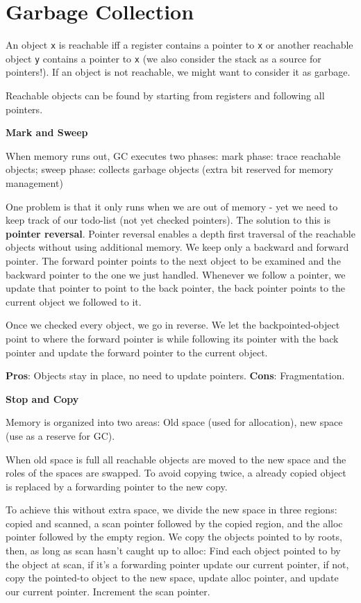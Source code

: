 \section*{Garbage Collection}

An object \texttt{x} is reachable iff a register contains a pointer to \texttt{x} or another reachable object \texttt{y} contains a pointer to \texttt{x} (we also consider the stack as a source for pointers!). If an object is not reachable, we might want to consider it as garbage. \medskip
	
Reachable objects can be found by starting from registers and following all pointers. \medskip

\textbf{Mark and Sweep} \smallskip
	
When memory runs out, GC executes two phases: mark phase: trace reachable objects; sweep phase: collects garbage objects (extra bit reserved for memory management)\medskip
	
One problem is that it only runs when we are out of memory - yet we need to keep track of our todo-list (not yet checked pointers). The solution to this is \textbf{pointer reversal}. Pointer reversal enables a depth first traversal of the reachable objects without using additional memory. We keep only a backward and forward pointer. The forward pointer points to the next object to be examined and the backward pointer to the one we just handled. Whenever we follow a pointer, we update that pointer to point to the back pointer, the back pointer points to the current object we followed to it. \medskip 

Once we checked every object, we go in reverse. We let the backpointed-object point to where the forward pointer is while following its pointer with the back pointer and update the forward pointer to the current object. \medskip

\textbf{Pros}: Objects stay in place, no need to update pointers. \textbf{Cons}: Fragmentation.\medskip
	
\textbf{Stop and Copy} \smallskip
	
Memory is organized into two areas: Old space (used for allocation), new space (use as a reserve for GC). \medskip
	
When old space is full all reachable objects are moved to the new space and the roles of the spaces are swapped. To avoid copying twice, a already copied object is replaced by a forwarding pointer to the new copy. \medskip

To achieve this without extra space, we divide the new space in three regions: copied and scanned, a scan pointer followed by the copied region, and the alloc pointer followed by the empty region. We copy the objects pointed to by roots, then, as long as scan hasn't caught up to alloc: Find each object pointed to by the object at scan, if it's a forwarding pointer update our current pointer, if not, copy the pointed-to object to the new space, update alloc pointer, and update our current pointer. Increment the scan pointer. \medskip

